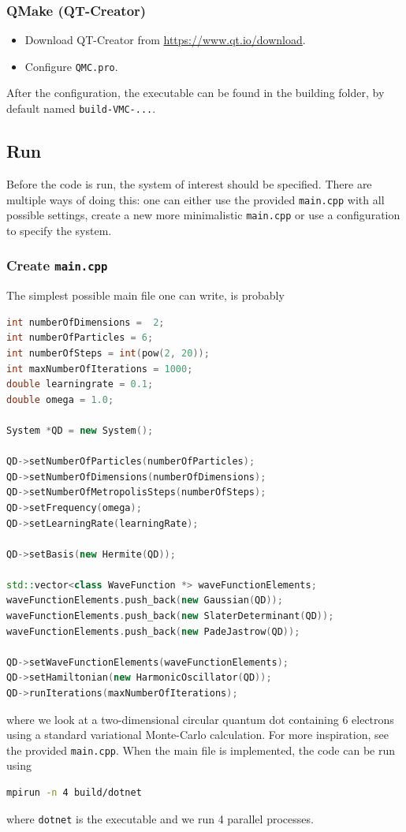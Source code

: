 \subsubsection{QMake (QT-Creator)}
\begin{itemize}
	\item Download QT-Creator from \url{https://www.qt.io/download}.
	\item Configure \lstinline{QMC.pro}.
\end{itemize}
After the configuration, the executable can be found in the building folder, by default named \lstinline{build-VMC-...}.

\subsection{Run}
Before the code is run, the system of interest should be specified. There are multiple ways of doing this: one can either use the provided \lstinline{main.cpp} with all possible settings, create a new more minimalistic \lstinline{main.cpp} or use a configuration to specify the system. 

\subsubsection{Create \lstinline{main.cpp}}
The simplest possible main file one can write, is probably
\lstset{basicstyle=\scriptsize}
\begin{lstlisting}[language={C++}]
int numberOfDimensions =  2;
int numberOfParticles = 6;
int numberOfSteps = int(pow(2, 20));
int maxNumberOfIterations = 1000;
double learningrate = 0.1;
double omega = 1.0;

System *QD = new System();

QD->setNumberOfParticles(numberOfParticles);
QD->setNumberOfDimensions(numberOfDimensions);
QD->setNumberOfMetropolisSteps(numberOfSteps);
QD->setFrequency(omega);
QD->setLearningRate(learningRate);

QD->setBasis(new Hermite(QD));

std::vector<class WaveFunction *> waveFunctionElements;
waveFunctionElements.push_back(new Gaussian(QD));
waveFunctionElements.push_back(new SlaterDeterminant(QD));
waveFunctionElements.push_back(new PadeJastrow(QD));

QD->setWaveFunctionElements(waveFunctionElements);
QD->setHamiltonian(new HarmonicOscillator(QD));
QD->runIterations(maxNumberOfIterations);
\end{lstlisting}
where we look at a two-dimensional circular quantum dot containing 6 electrons using a standard variational Monte-Carlo calculation. For more inspiration, see the provided \lstinline{main.cpp}. When the main file is implemented, the code can be run using
\lstset{basicstyle=\scriptsize}
\begin{lstlisting}[language={bash}]
mpirun -n 4 build/dotnet
\end{lstlisting}
where \lstinline{dotnet} is the executable and we run 4 parallel processes. 


